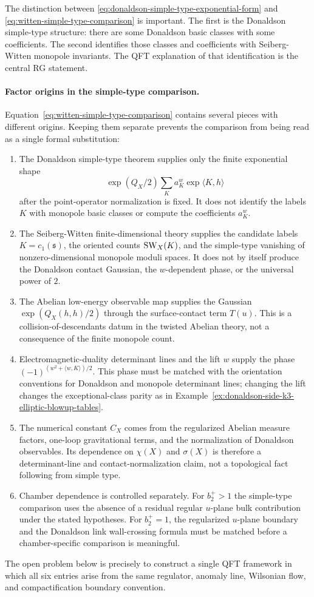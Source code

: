 The distinction between
\eqref{eq:donaldson-simple-type-exponential-form} and
\eqref{eq:witten-simple-type-comparison} is important.  The first is the
Donaldson simple-type structure: there are some Donaldson basic classes with
some coefficients.  The second identifies those classes and coefficients with
Seiberg-Witten monopole invariants.  The QFT explanation of that
identification is the central RG statement.

\paragraph{Factor origins in the simple-type comparison.}
Equation~\eqref{eq:witten-simple-type-comparison} contains several pieces
with different origins.  Keeping them separate prevents the comparison from
being read as a single formal substitution:
\begin{enumerate}
\item The Donaldson simple-type theorem supplies only the finite exponential
shape
\[
  \exp(Q_X/2)\sum_K a_K^w\exp\langle K,h\rangle
\]
after the point-operator normalization is fixed.  It does not identify the
labels \(K\) with monopole basic classes or compute the coefficients
\(a_K^w\).
\item The Seiberg-Witten finite-dimensional theory supplies the candidate
labels \(K=c_1(\mathfrak s)\), the oriented counts \({\rm SW}_X(K)\), and the
simple-type vanishing of nonzero-dimensional monopole moduli spaces.  It does
not by itself produce the Donaldson contact Gaussian, the \(w\)-dependent
phase, or the universal power of \(2\).
\item The Abelian low-energy observable map supplies the Gaussian
\(\exp(Q_X(h,h)/2)\) through the surface-contact term \(T(u)\).  This is a
collision-of-descendants datum in the twisted Abelian theory, not a
consequence of the finite monopole count.
\item Electromagnetic-duality determinant lines and the lift \(w\) supply the
phase
\((-1)^{(w^2+\langle w,K\rangle)/2}\).  This phase must be matched with the
orientation conventions for Donaldson and monopole determinant lines; changing
the lift changes the exceptional-class parity as in
Example~\ref{ex:donaldson-side-k3-elliptic-blowup-tables}.
\item The numerical constant \(C_X\) comes from the regularized Abelian
measure factors, one-loop gravitational terms, and the normalization of
Donaldson observables.  Its dependence on \(\chi(X)\) and \(\sigma(X)\) is
therefore a determinant-line and contact-normalization claim, not a
topological fact following from simple type.
\item Chamber dependence is controlled separately.  For \(b_2^+>1\) the
simple-type comparison uses the absence of a residual regular \(u\)-plane
bulk contribution under the stated hypotheses.  For \(b_2^+=1\), the
regularized \(u\)-plane boundary and the Donaldson link wall-crossing formula
must be matched before a chamber-specific comparison is meaningful.
\end{enumerate}
The open problem below is precisely to construct a single QFT framework in
which all six entries arise from the same regulator, anomaly line,
Wilsonian flow, and compactification boundary convention.

